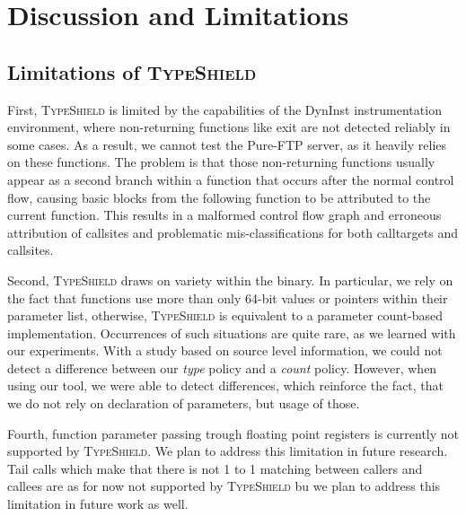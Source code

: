 \section{Discussion and Limitations}
\label{chapter:Discussion}

\subsection{Limitations of \textsc{TypeShield}}
First, \textsc{TypeShield} is limited by the capabilities of the DynInst instrumentation environment, where non-returning functions like exit are 
not detected reliably in some cases. As a result, we cannot test the Pure-FTP server, as it heavily relies on these functions. 
The problem is that those non-returning functions usually appear as a second branch within a function that occurs after the normal 
control flow, causing basic blocks from the following function to be attributed to the current function. This results in a malformed 
control flow graph and erroneous attribution of callsites and problematic mis-classifications for both calltargets and callsites.

Second, \textsc{TypeShield} draws on variety within the binary. In particular, we rely on the fact that functions use more than only 
64-bit values or pointers within their parameter list, otherwise, \textsc{TypeShield} is equivalent to a parameter count-based implementation. 
Occurrences of such situations are quite rare, as we learned with our experiments. With a study based on source level information, we could not 
detect a difference between our \textit{type} policy and a \textit{count} policy. However, when using our tool, we were able to detect differences,
which reinforce the fact, that we do not rely on declaration of parameters, but usage of those.


Fourth, function parameter passing trough floating point registers is currently not supported by \textsc{TypeShield}. We plan 
to address this limitation in future research. Tail calls which make that there is not 1 to 1 matching between callers and callees 
are as for now not supported by \textsc{TypeShield} bu we plan to address this limitation in future work as well.


